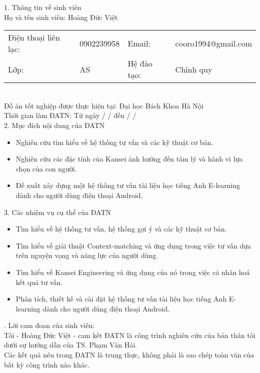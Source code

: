  
 
\begin{acknowledgementslong}      
1. Thông tin về sinh viên\\
Họ và tên sinh viên: Hoàng Đức Việt\\
\begin{tabular}{@{}l l l l}
Điện thoại liên lạc: & 0902239958 & Email: & cooro1994@gmail.com \\ 
Lớp: &AS & Hệ đào tạo:  & Chính quy
\end{tabular}\\
Đồ án tốt nghiệp được thực hiện tại: Đại học Bách Khoa Hà Nội\\
Thời gian làm ĐATN: Từ ngày  /  /    đến   /  /    \\[0.5cm]
2. Mục đích nội dung của ĐATN 
\begin{itemize}
\item Nghiên cứu tìm hiểu về hệ thống tư vấn và các kỹ thuật cơ bản.  
\item Nghiên cứu các đặc tính của Kansei ảnh hưởng đến tâm lý và hành vi lựa chọn của con người.
\item Đề xuất xây dựng một hệ thống tư vấn tài liệu học tiếng Anh E-learning dành cho người dùng điện thoại Android.\\
\end{itemize}

3. Các nhiệm vụ cụ thể của ĐATN 
\begin{itemize}
\item Tìm hiểu về hệ thống tư vấn, hệ thống gợi ý và các kỹ thuật cơ bản.
\item Tìm hiểu về giải thuật Context-matching và ứng dụng trong việc tư vấn dựa trên nguyện vọng và năng lực của người dùng.
\item Tìm hiểu về Kansei Engineering và ứng dụng của nó trong việc cá nhân hoá kết quả tư vấn.
\item Phân tích, thiết kế và cài đặt hệ thống tư vấn tài liệu học tiếng Anh E-learning dành cho người dùng điện thoại Android.
\end{itemize}
. Lời cam đoan của sinh viên:\\
Tôi - Hoàng Đức Việt - cam kết ĐATN là công trình nghiên cứu của bản thân tôi dưới sự hướng dẫn của TS. Phạm Văn Hải. \\
Các kết quả nêu trong ĐATN là trung thực, không phải là sao chép toàn văn của bất kỳ công trình nào khác.\\


\end{acknowledgementslong}
